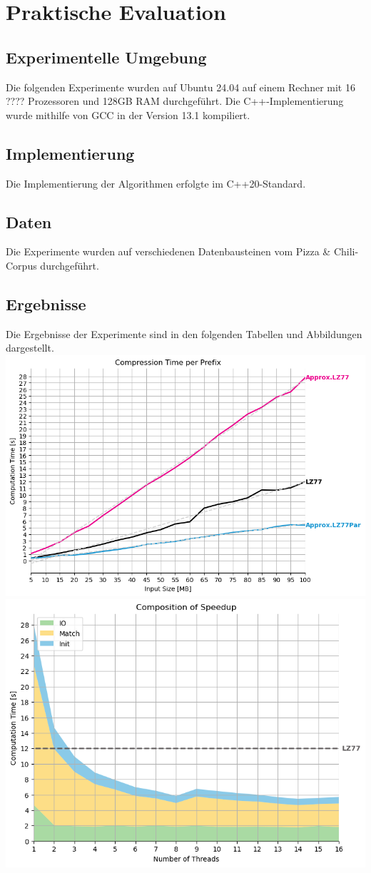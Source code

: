 \chapter{Praktische Evaluation}

\section{Experimentelle Umgebung}
Die folgenden Experimente wurden auf Ubuntu 24.04 auf einem Rechner mit 16 ???? Prozessoren und 128GB RAM durchgeführt. Die C++-Implementierung wurde
mithilfe von GCC in der Version 13.1 kompiliert.

\section{Implementierung}
Die Implementierung der Algorithmen erfolgte im C++20-Standard.

\section{Daten}
Die Experimente wurden auf verschiedenen Datenbausteinen vom Pizza \& Chili-Corpus durchgeführt.

\section{Ergebnisse}
Die Ergebnisse der Experimente sind in den folgenden Tabellen und Abbildungen dargestellt.\\
\includegraphics[scale = 0.65]{bilder/progressive.png}\\
\includegraphics[scale = 0.65]{bilder/progressive_speedup_stack.png}